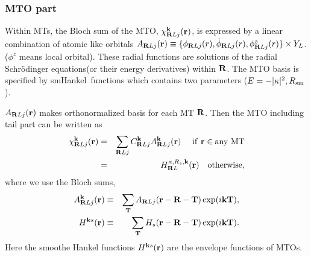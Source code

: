 \documentclass[a4paper,10pt,epsf,fleqn]{article}
\def\brl{{\bf R}L}
\def\smh{smHankel}
\newcommand{\bfT}{{\bf T}}
\newcommand{\bfR}{{\bf R}}
\begin{document}
\subsubsection{ MTO part}
Within MTs, the Bloch sum of the MTO, 
$\chi^{{\bf k}}_{\brl{j}}({\bf r})$, is 
expressed by a linear combination of atomic like orbitals 
$A_{\bfR{Lj}}({\bf r})
\equiv \{ 
\phi_{\bfR{Lj}}(r),\dot{\phi}_{\bfR{Lj}}(r),\phi^z_{\bfR{Lj}}(r) \}
\times Y_L$. ($\phi^z$ means local orbital).
These radial functions are solutions of
the radial Schr\"odinger equations(or their energy derivatives)
within $\bfR$. %
The MTO basis is specified by \smh\ functions which
contains two parameters ($E=-|\kappa|^2,R_{\rm sm}$).

$A_{\bfR{Lj}}({\bf r})$ makes orthonormalized basis for each MT $\bfR$.
Then the MTO including tail part can be written as
\begin{eqnarray}
\label{coeff}
\chi^{{\bf k}}_{\bfR{Lj}}({\bf r}) &=& \sum_{\bfR{Lj}} C^{{\bf k}}_{\bfR{Lj}} A^{\bf k}_{\bfR{Lj}}({\bf r})   \ \ \ {\rm \ if \ {\bf r} \in any \ MT} \nonumber \\
        &=&   H^{\kappa,R_s,{\bf k}}_{\bfR{L}}({\bf r}) \ \ \ {\rm otherwise},
\end{eqnarray}
where we use the Bloch sums,
\begin{eqnarray}
A^{\bf k}_{\bfR{Lj}}({\bf r}) &\equiv& \sum_{\bf T} A_{\bfR{Lj}}({\bf r-\bfR-\bfT}) \exp(i {\bf kT}), \\
H^{{\bf k}s}({\bf r})   &\equiv& \sum_{\bf T} H_{s}({\bf r-\bfR-\bfT}) \exp(i {\bf kT}).
\end{eqnarray}
Here the smoothe Hankel functions $H^{{\bf k}s}({\bf r})$ are 
the envelope functions of MTOs.
\end{document}
